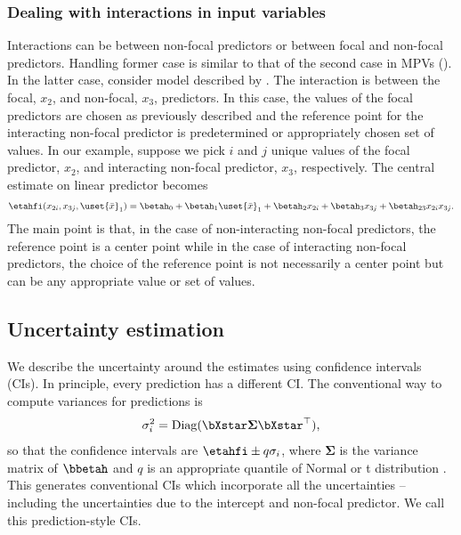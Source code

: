 \subsubsection{Dealing with interactions in input variables}

Interactions can be between non-focal predictors or between focal and non-focal
predictors. Handling former case is similar to that of the second case
in MPVs (). In the latter case, consider model described by . The interaction is between the focal, $x_2$, and non-focal, $x_3$, predictors. In this case, the values of the focal predictors are chosen as previously described and the reference point for the interacting non-focal predictor is predetermined or appropriately chosen set of values. In our example, suppose we pick $i$ and $j$ unique values of the focal predictor, $x_2$, and interacting non-focal predictor, $x_3$, respectively. The central estimate on linear predictor becomes
%
\begin{align*}
\etahfi(x_{2i}, x_{3j}, {\uset{\bar{x}}_1}) = \betah_0 + \betah_1 \uset{\bar{x}}_1 + \betah_2x_{2i} + \betah_3x_{3j} + \betah_{23}x_{2i}x_{3j}.
\end{align*}
%
The main point is that, in the case of non-interacting non-focal predictors, the reference point is a center point while in the case of interacting non-focal predictors, the choice of the reference point is not necessarily a center point but can be any appropriate value or set of values.

\subsection{Uncertainty estimation}

We describe the uncertainty around the estimates using confidence intervals (CIs). In principle, every prediction has a different CI. The conventional way to compute variances for predictions is 
%
\begin{align}\label{eq:conventional_variance}
\sigma^2_i = \mathrm{Diag}(\bXstar \boldsymbol{\Sigma} {\bXstar}^\top), 
\end{align}
%
so that the confidence intervals are $\etahfi \pm q\sigma_i$, where $\boldsymbol\Sigma$ is the variance matrix of $\bbetah$ and $q$ is an appropriate quantile of Normal or t distribution \citep{fox2009effect}. This generates conventional CIs which incorporate all the uncertainties -- including the uncertainties due to the intercept and non-focal predictor. We call this prediction-style CIs. 

